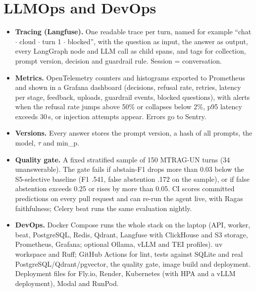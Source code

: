 \documentclass[11pt,a4paper]{report}
\begin{document}
\section{LLMOps and DevOps}
\begin{itemize}
\item \textbf{Tracing (Langfuse).} One readable trace per turn, named for example ``chat $\cdot$ cloud $\cdot$ turn 1 $\cdot$ blocked'', with the question as input, the answer as output, every LangGraph node and LLM call as child spans, and tags for collection, prompt version, decision and guardrail rule. Session = conversation.
\item \textbf{Metrics.} OpenTelemetry counters and histograms exported to Prometheus and shown in a Grafana dashboard (decisions, refusal rate, retries, latency per stage, feedback, uploads, guardrail events, blocked questions), with alerts when the refusal rate jumps above 50\% or collapses below 2\%, p95 latency exceeds 30\,s, or injection attempts appear. Errors go to Sentry.
\item \textbf{Versions.} Every answer stores the prompt version, a hash of all prompts, the model, $\tau$ and min\_p.
\item \textbf{Quality gate.} A fixed stratified sample of 150 MTRAG-UN turns (34 unanswerable). The gate fails if abstain-F1 drops more than 0.03 below the S5-selective baseline (F1 .541, false abstention .172 on the sample), or if false abstention exceeds 0.25 or rises by more than 0.05. CI scores committed predictions on every pull request and can re-run the agent live, with Ragas faithfulness; Celery beat runs the same evaluation nightly.
\item \textbf{DevOps.} Docker Compose runs the whole stack on the laptop (API, worker, beat, PostgreSQL, Redis, Qdrant, Langfuse with ClickHouse and S3 storage, Prometheus, Grafana; optional Ollama, vLLM and TEI profiles). uv workspace and Ruff; GitHub Actions for lint, tests against SQLite and real PostgreSQL/Qdrant/pgvector, the quality gate, image build and deployment. Deployment files for Fly.io, Render, Kubernetes (with HPA and a vLLM deployment), Modal and RunPod.
\end{itemize}
\end{document}
